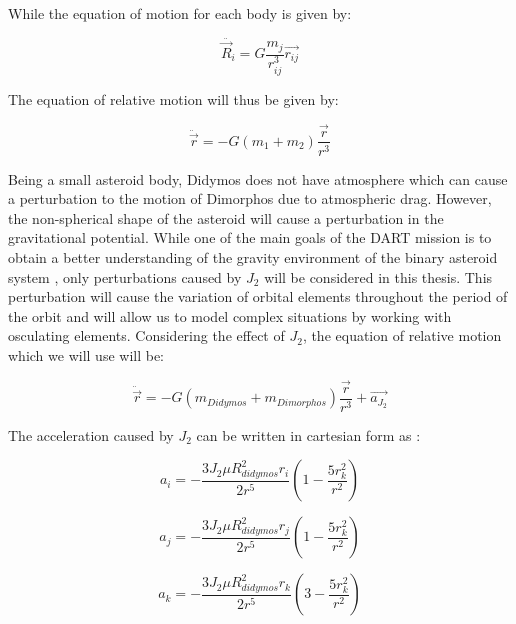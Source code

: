 While the equation of motion for each body is given by:

\begin{equation}
	\ddot{\overrightarrow{R}_{i}}=G \frac{m_{j}}{r_{i j}^{3}} \overrightarrow{r_{i j}}
\end{equation}

The equation of relative motion will thus be given by:

\begin{equation}
	\ddot{\overrightarrow{r}} = -G\left(m_{1}+m_{2}\right) \frac{\overrightarrow{r}}{r^{3}}
\end{equation}

Being a small asteroid body, Didymos does not have atmosphere which can cause a perturbation to the motion of Dimorphos due to atmospheric drag. However, the non-spherical shape of the asteroid will cause a perturbation in the gravitational potential. While one of the main goals of the DART mission is to obtain a better understanding of the gravity environment of the binary asteroid system \cite{dart-requirements}, only perturbations caused by $J_2$ will be considered in this thesis. This perturbation will cause the variation of orbital elements throughout the period of the orbit and will allow us to model complex situations by working with osculating elements. Considering the effect of $J_{2}$, the equation of relative motion which we will use will be:

\begin{equation}
	\ddot{\overrightarrow{r}} = -G\left(m_{Didymos}+m_{Dimorphos}\right) \frac{\overrightarrow{r}}{r^{3}} + \overrightarrow{a_{J_2}}
\end{equation}

The acceleration caused by $J_{2}$ can be written in cartesian form as \cite{vallado}:

\begin{equation}
	a_{i}=-\frac{3 J_{2} \mu R_{didymos}^{2} r_{i}}{2 r^{5}}\left(1-\frac{5 r_{k}^{2}}{r^{2}}\right)
\end{equation}

\begin{equation}
	a_{j}=-\frac{3 J_{2} \mu R_{didymos}^{2} r_{j}}{2 r^{5}}\left(1-\frac{5 r_{k}^{2}}{r^{2}}\right)
\end{equation}

\begin{equation}
	a_{k}=-\frac{3 J_{2} \mu R_{didymos}^{2} r_{k}}{2 r^{5}}\left(3-\frac{5 r_{k}^{2}}{r^{2}}\right)
\end{equation}


